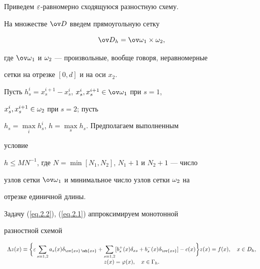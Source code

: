 \label{section.3}








Приведем $\varepsilon$-равномерно сходящуюся разностную схему.


На множестве $\od$ введем прямоугольную сетку


\begin{equation} \label{eq.3.1}


\od_h=\ovo_1 \times \om_2,


\end{equation}


где $\ovo_1$ и $\omega_2$ --- произвольные, вообще говоря, неравномерные


сетки на отрезке $[0,d]$ и на оси $x_2$.


Пусть $h^i_s=x_s^{i+1}-x_s^i$, $x^i_s,x_s^{i+1} \in \ovo_1$ при $s=1$,


$x_s^i, x_s^{i+1} \in \omega_2$ при $s=2$; пусть


$h_s=\max\limits_i h_s^i$, $h=\max\limits_s h_s$. Предполагаем выполненным


условие


$h \leq M N^{-1}$, где $ N=\min [N_1, N_2]$, $N_1+1$ и $N_2+1$ --- число


узлов сетки $\ovo_1$ и минимальное число узлов сетки $\omega_2$ на


отрезке единичной длины.





Задачу (\ref{eq.2.2}), (\ref{eq.2.1}) аппроксимируем монотонной


разностной схемой \cite{2}


\begin{equation} \label{eq.3.2}


\begin{array}{c}


\La z(x) \eq\displaystyle \bigg\{ \eps \sum_{s=1,2} a_s(x)


\de_{\ov{xs}\,\wh{xs}}+\sum_{s=1,2} [b^+_s(x)\de_{xs}+


b^-_s(x)\de_{\ov{xs}}]- c(x) \bigg\} z(x) = f(x),


\quad x\in D_h,\\[3mm]


%


z(x) = \vp(x), \quad x \in \G_h.


\end{array}


\end{equation}


